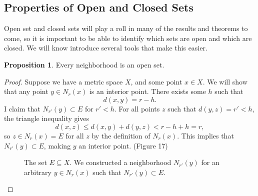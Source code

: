 \documentclass{article}
\theoremstyle{definition}
\newtheorem{proposition}{Proposition}[section]
\begin{document}
\subsection{Properties of Open and Closed Sets}
Open set and closed sets will play a roll in many of the results and theorems to come, so it is important to be able to identify which sets are open and which are closed. We will know introduce several tools that make this easier.  
\begin{proposition}
	Every neighborhood is an open set.
\end{proposition}
\begin{proof}
	Suppose we have a metric space $ X $, and some point $ x\in X $. We will show that any point $ y\in N_r(x) $ is an interior point. There exists some $ h $ such that $$d(x,y)=r-h .$$ I claim that $ N_{r'}(y)\subset E $ for $ r'<h $. For all points $ z $ such that $ d(y,z)=r'<h $, the triangle inequality gives $$d(x,z)\le d(x,y)+d(y,z)<r-h+h=r, $$ so $ z\in N_r(x)=E $ for all $ z $ by the definition of $ N_r(x) $. This implies that $ N_{r'}(y)\subset E $, making $ y $ an interior point. (Figure 17)
	\begin{figure}[h]
		\centering
		\caption{The set $ E\subseteq X $. We constructed a neighborhood $ N_{r'}(y) $ for an arbitrary $ y\in N_r(x) $ such that $ N_{r'}(y)\subset E $. }
	\end{figure}
\end{proof}
\end{document}

